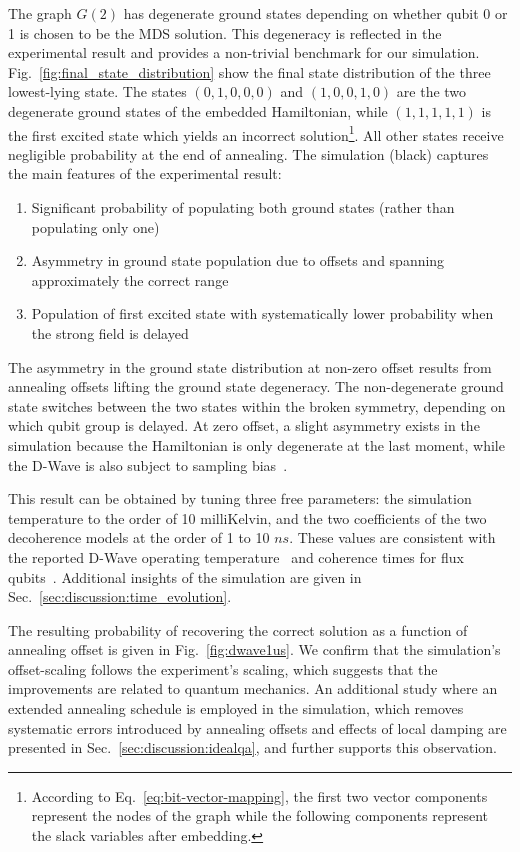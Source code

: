 \documentclass[prd,twocolumn,tightenlines,preprintnumbers,showpacs,superscriptaddress,notitlepage,nofootinbib,eqsecnum,floatfix,longbibliography,aps,10pt]{revtex4-1}
\begin{document}
The graph $G(2)$ has degenerate ground states depending on whether qubit 0 or 1 is chosen to be the MDS solution.
This degeneracy is reflected in the experimental result and provides a non-trivial benchmark for our simulation.
Fig.~\ref{fig:final_state_distribution} show the final state distribution of the three lowest-lying state.
The states $(0, 1, 0, 0, 0)$ and $(1, 0, 0, 1, 0)$ are the two degenerate ground states of the embedded Hamiltonian, while $(1, 1, 1, 1, 1)$ is the first excited state which yields an incorrect solution\footnote{According to Eq.~\eqref{eq:bit-vector-mapping}, the first two vector components represent the nodes of the graph while the following components represent the slack variables after embedding.}.
All other states receive negligible probability at the end of annealing.
The simulation (black) captures the main features of the experimental result:
\begin{enumerate}
    \item Significant probability of populating both ground states (rather than populating only one)
    \item Asymmetry in ground state population due to offsets and spanning approximately the correct range
    \item Population of first excited state with systematically lower probability when the strong field is delayed
\end{enumerate}
The asymmetry in the ground state distribution at non-zero offset results from annealing offsets lifting the ground state degeneracy.
The non-degenerate ground state switches between the two states within the broken symmetry, depending on which qubit group is delayed. At zero offset, a slight asymmetry exists in the simulation because the Hamiltonian is only degenerate at the last moment, while the D-Wave is also subject to sampling bias~\cite{2016PhRvA..93e2320K, 2017PhRvL.118g0502M}.

This result can be obtained by tuning three free parameters: the simulation temperature to the order of 10 milliKelvin, and the two coefficients of the two decoherence models at the order of 1 to 10 $ns$. These values are consistent with the reported D-Wave operating temperature~\cite{dwave_temp} and coherence times for flux qubits~\cite{2003Sci...299.1869C}.
Additional insights of the simulation are given in Sec.~\ref{sec:discussion:time_evolution}.

The resulting probability of recovering the correct solution as a function of annealing offset is given in Fig.~\ref{fig:dwave1us}.
We confirm that the simulation's offset-scaling follows the experiment's scaling, which suggests that the improvements are related to quantum mechanics.
An additional study where an extended annealing schedule is employed in the simulation, which removes systematic errors introduced by annealing offsets and effects of local damping are presented in Sec.~\ref{sec:discussion:idealqa}, and further supports this observation.
\end{document}

